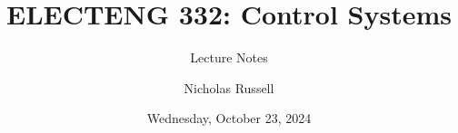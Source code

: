 \documentclass[
  14pt,
  a4paper,
  oneside,
  open=any,
  a4paper,
  14pt]{report}
\title{ELECTENG 332: Control Systems}
\subtitle{Lecture Notes}
\author{Nicholas Russell}
\date{Wednesday, October 23, 2024}
\begin{document}


\begin{titlepage}


\newcommand{\titlepagepagealign}{
\ifthenelse{\equal{center}{right}}{\raggedleft}{}
\ifthenelse{\equal{center}{center}}{\centering}{}
\ifthenelse{\equal{center}{left}}{\raggedright}{}
}


\newcommand{\titleandsubtitle}{
{{\huge{\bfseries{\nohyphens{ELECTENG 332: Control Systems}}}}\par
}%

\vspace{\betweentitlesubtitle}
{
{\Large{\nohyphens{Lecture Notes}}}\par
}}
\newcommand{\titlepagetitleblock}{
\newcommand{\HRule}{\rule{\linewidth}{0.5mm}} 

\HRule\\[0.4cm]

\titleandsubtitle

\HRule\\
}
\newcommand{\authorstyle}[1]{{\large{#1}}}

\newcommand{\affiliationstyle}[1]{{\large{#1}}}

\newcommand{\titlepageauthorblock}{
{\authorstyle{
Nicholas Russell\\University of Auckland\\Department of Electrical,
Computer, and Software Engineering}}}

\newcommand{\titlepageaffiliationblock}{}
\newcommand{\headerstyled}{%
{\textsc{\LARGE{}}}
}
\newcommand{\footerstyled}{%
{}
}
\newcommand{\datestyled}{%
{\large{Wednesday, October 23, 2024}}
}


\newcommand{\titlepageheaderblock}{\headerstyled}

\newcommand{\titlepagefooterblock}{
\footerstyled
}

\newcommand{\titlepagedateblock}{
\datestyled
}

\newcommand{\titleblock}{\newlength{\betweentitlesubtitle}
\setlength{\betweentitlesubtitle}{\baselineskip}
{

{\titlepagetitleblock}
}

\vspace{1.5cm}
}

\newcommand{\authorblock}{{\titlepageauthorblock}

\vspace{1cm}
}


\end{titlepage}
\end{document}

